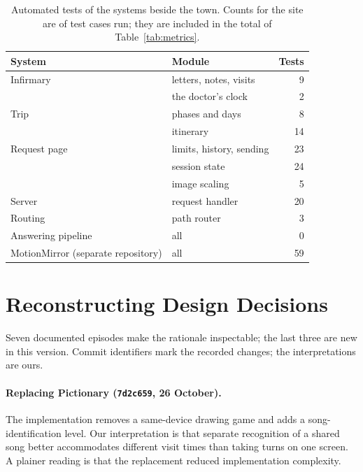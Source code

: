 \documentclass[sigconf,nonacm]{acmart}
\newcommand{\code}[1]{\textnormal{\texttt{\small #1}}}
\begin{document}
\begin{table}[t]
  \caption{Automated tests of the systems beside the town. Counts for the site are of test
  cases run; they are included in the total of Table~\ref{tab:metrics}.}
  \label{tab:producttests}
  \small
  \begin{tabular}{@{}p{}p{}r@{}}
    \toprule
    System & Module & Tests \\
    \midrule
    Infirmary & letters, notes, visits & 9 \\
     & the doctor's clock & 2 \\
    Trip & phases and days & 8 \\
     & itinerary & 14 \\
    Request page & limits, history, sending & 23 \\
     & session state & 24 \\
     & image scaling & 5 \\
    Server & request handler & 20 \\
    Routing & path router & 3 \\
    Answering pipeline & all & 0 \\
    \midrule
    MotionMirror (separate repository) & all & 59 \\
    \bottomrule
  \end{tabular}
\end{table}


\section{Reconstructing Design Decisions}\label{sec:log}
Seven documented episodes make the rationale inspectable; the last three are new in this
version. Commit identifiers mark the recorded changes; the interpretations are ours.

\paragraph{Replacing Pictionary (\code{7d2c659}, 26 October).}
The implementation removes a same-device drawing game and adds a song-identification level.
Our interpretation is that separate recognition of a shared song better accommodates different
visit times than taking turns on one screen. A plainer reading is that the replacement reduced
implementation complexity.
\end{document}
